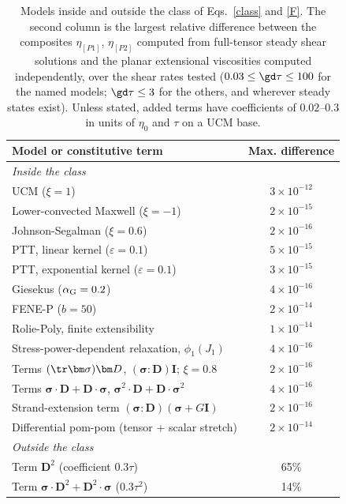 \begin{table}
\caption{Models inside and outside the class of Eqs.~\eqref{class} and \eqref{F}. The second column is the largest relative difference between the composites $\eta_{[P1]}$, $\eta_{[P2]}$ computed from full-tensor steady shear solutions and the planar extensional viscosities computed independently, over the shear rates tested ($0.03\le\gd\tau\le100$ for the named models; $\gd\tau\le3$ for the others, and wherever steady states exist). Unless stated, added terms have coefficients of $0.02$--$0.3$ in units of $\eta_0$ and $\tau$ on a UCM base.}\label{tab:class}
\begin{ruledtabular}
\begin{tabular}{lc}
Model or constitutive term & Max. difference\\
\hline
\multicolumn{2}{l}{\emph{Inside the class}}\\
UCM ($\xi=1$) & $3\times10^{-12}$\\
Lower-convected Maxwell ($\xi=-1$) & $2\times10^{-15}$\\
Johnson-Segalman ($\xi=0.6$) & $2\times10^{-16}$\\
PTT, linear kernel ($\varepsilon=0.1$) & $5\times10^{-15}$\\
PTT, exponential kernel ($\varepsilon=0.1$) & $3\times10^{-15}$\\
Giesekus ($\alpha_{\rm G}=0.2$) & $4\times10^{-16}$\\
FENE-P ($b=50$) & $2\times10^{-14}$\\
Rolie-Poly, finite extensibility & $1\times10^{-14}$\\
Stress-power-dependent relaxation, $\phi_1(J_1)$ & $4\times10^{-16}$\\
Terms $(\tr\bm\sigma)\bm D$, $(\bm\sigma\!:\!\bm D)\bm I$; $\xi=0.8$ & $2\times10^{-16}$\\
Terms $\bm\sigma\!\cdot\!\bm D+\bm D\!\cdot\!\bm\sigma$, $\bm\sigma^2\!\cdot\!\bm D+\bm D\!\cdot\!\bm\sigma^2$ & $4\times10^{-16}$\\
Strand-extension term $(\bm\sigma\!:\!\bm D)(\bm\sigma+G\bm I)$ & $2\times10^{-16}$\\
Differential pom-pom (tensor + scalar stretch) & $2\times10^{-14}$\\
\hline
\multicolumn{2}{l}{\emph{Outside the class}}\\
Term $\bm D^2$ (coefficient $0.3\tau$) & 65\%\\
Term $\bm\sigma\!\cdot\!\bm D^2+\bm D^2\!\cdot\!\bm\sigma$ ($0.3\tau^2$) & 14\%\\

\end{tabular}
\end{ruledtabular}
\end{table}
